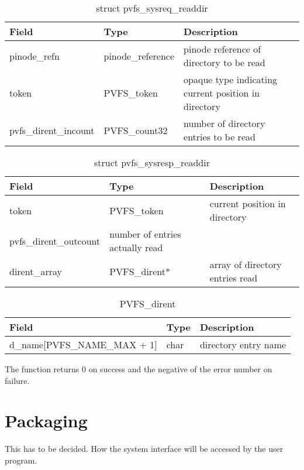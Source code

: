 \documentclass[11pt, letterpaper]{article}
\begin{document}
\begin{table}[H]
\begin{tabular}{|l|l|l|}
\hline
Field & Type & Description \\
\hline
\hline
pinode\_refn & pinode\_reference & pinode reference of directory to be
read \\
\hline
token & PVFS\_token & opaque type indicating current position in directory \\
\hline
pvfs\_dirent\_incount & PVFS\_count32 & number of directory entries to
be read \\
\hline
\hline
\end{tabular}
\caption{struct pvfs\_sysreq\_readdir}\label{tab:reqreaddir}
\end{table}

\begin{table}[H]
\begin{tabular}{|l|l|l|}
\hline
Field & Type & Description \\
\hline
\hline
token &  PVFS\_token &  current position in directory \\
\hline
pvfs\_dirent\_outcount & number of entries actually read \\
\hline
dirent\_array & PVFS\_dirent* & array of directory entries read \\
\hline
\end{tabular}
\caption{struct pvfs\_sysresp\_readdir}\label{tab:respreaddir}
\end{table}

\begin{table}[H]
\begin{tabular}{|l|l|l|}
\hline
Field & Type & Description \\
\hline
\hline
d\_name[PVFS\_NAME\_MAX + 1] & char & directory entry name \\
\hline
\end{tabular}
\caption{PVFS\_dirent}\label{tab:dirent}
\end{table}

The function returns 0 on success and the negative of the error
number on failure.

\section{Packaging}

This has to be decided.  How the system interface will be accessed by
the user program.
\end{document}
